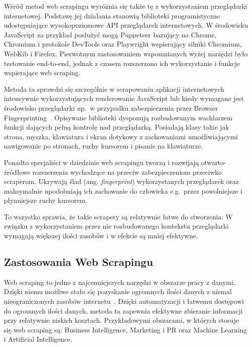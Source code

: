 Wśród metod web scrapingu wyróżnia się także tę z wykorzystaniem przeglądarki internetowej.
Podstawę jej działania stanowią biblioteki programistyczne udostępniające wysokopoziomowe API przeglądarek internetowych.
W środowisku JavaScript za przykład posłużyć mogą Puppeteer bazujący na Chrome, Chromium i protokole DevTools
oraz Playwright wspierający silniki Chromium, WebKib i Firefox.
Pierwotnym zastosowaniem wspomnianych wyżej narzędzi było testowanie end-to-end, jednak z czasem rozszerzono ich wykorzystanie i funkcje wspierające web scraping.

Metoda ta sprawdzi się szczególnie w scrapowaniu aplikacji internetowych intensywnie wykorzystujących renderowanie JavaScript
lub kiedy wymagane jest środowisko przeglądarki np.~w przypadku zabezpieczenia przez Browser Fingerprinting~\cite{apify-headless-browsers}.
Opisywane biblioteki dysponują rozbudowanym wachlarzem funkcji dających pełną kontrolę nad przeglądarką.
Posiadają klasy takie jak strona, myszka, klawiatura i ekran dotykowy z zachowaniami umożliwiającymi nawigowanie po stronach,
ruchy kursorem i pisanie na klawiaturze.

Ponadto specjaliści w dziedzinie web scrapingu tworzą i rozwijają otwarto-źródłowe rozszerzenia wychodzące na przeciw zabezpieczeniom przeciwko scraperom.
Ukrywają ślad (ang. \emph{fingerprint}) wykorzystanych przeglądarek oraz maksymalnie upodobniają ich zachowanie do człowieka e.g.~przez powolniejsze i płynniejsze ruchy kursorem.

To wszystko sprawia, że takie scrapery są relatywnie łatwe do stworzenia.
W związku z wykorzystaniem przez nie rozbudowanego kontekstu przeglądarki wymagają większej ilości zasobów i w efekcie są mniej efektywne.

\subsection{Zastosowania Web Scrapingu}\label{subsec:web-scraping-applications}

Web scraping to jedno z najcenniejszych narzędzi w obszarze pracy z danymi.
Dzięki niemu możliwe stało się pozyskanie ogromnych ilości danych z niemal nieograniczonych zasobów internetu~\cite{Zhao2017}.
Dzięki automatyzacji i łatwemu dostępowi do ogromnych ilości danych, metoda ta zapewnia efektywne zbieranie informacji przy relatywnie niskich kosztach.
Przykładowymi obszarami, w których stosuje się web scraping są: Business Intelligence, Marketing i PR oraz Machine Learning i Artificial Intelligence.

